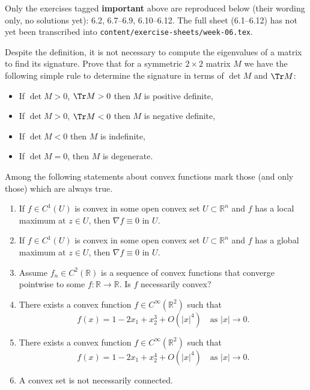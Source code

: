 \begin{ainote}
Only the exercises tagged \textbf{important} above are reproduced below (their wording only, no
solutions yet): 6.2, 6.7--6.9, 6.10--6.12. The full sheet (6.1--6.12) has not yet been
transcribed into \texttt{content/exercise-sheets/week-06.tex}.
\end{ainote}

\begin{exercise}
\label{ex:6.2}
Despite the definition, it is not necessary to compute the eigenvalues of a matrix to find its
signature. Prove that for a symmetric $2\times 2$ matrix $M$ we have the following simple rule to
determine the signature in terms of $\det M$ and $\Tr M$:
\begin{itemize}
  \item If $\det M > 0$, $\Tr M > 0$ then $M$ is positive definite,
  \item If $\det M > 0$, $\Tr M < 0$ then $M$ is negative definite,
  \item If $\det M < 0$ then $M$ is indefinite,
  \item If $\det M = 0$, then $M$ is degenerate.
\end{itemize}
\end{exercise}

\begin{exercise}
\label{ex:6.7}
Among the following statements about convex functions mark those (and only those) which are
always true.
\begin{enumerate}[label=\textbf{(\alph*)}]
  \item If $f \in C^1(U)$ is convex in some open convex set $U \subset \mathbb{R}^n$ and $f$ has a
    local maximum at $z \in U$, then $\nabla f \equiv 0$ in $U$.
  \item If $f \in C^1(U)$ is convex in some open convex set $U \subset \mathbb{R}^n$ and $f$ has a
    global maximum at $z \in U$, then $\nabla f \equiv 0$ in $U$.
  \item Assume $f_n \in C^2(\mathbb{R})$ is a sequence of convex functions that converge
    pointwise to some $f : \mathbb{R} \to \mathbb{R}$. Is $f$ necessarily convex?
  \item There exists a convex function $f \in C^\infty(\mathbb{R}^2)$ such that
    \[f(x) = 1 - 2x_1 + x_2^3 + O(|x|^4) \quad \text{as } |x| \to 0.\]
  \item There exists a convex function $f \in C^\infty(\mathbb{R}^2)$ such that
    \[f(x) = 1 - 2x_1 + x_2^4 + O(|x|^4) \quad \text{as } |x| \to 0.\]
  \item A convex set is not necessarily connected.
\end{enumerate}
\end{exercise}


